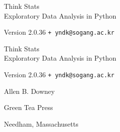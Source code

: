\documentclass[12pt]{book}
\makeatletter
\newcommand{\thetitle}{Think Stats}
\newcommand{\thesubtitle}{Exploratory Data Analysis in Python}
\newcommand{\theversion}{2.0.36 {\tt + yndk@sogang.ac.kr} }
\makeatother
\begin{document}
\begin{latexonly}

\renewcommand{\blankpage}{\thispagestyle{empty} \quad \newpage}



\thispagestyle{empty}

\begin{flushright}
\vspace*{2.0in}

\begin{spacing}{3}
{\huge \thetitle}\\
{\Large \thesubtitle }
\end{spacing}

\vspace{0.25in}

Version \theversion

\vfill

\end{flushright}


\blankpage
\blankpage

\pagebreak
\thispagestyle{empty}

\begin{flushright}
\vspace*{2.0in}

\begin{spacing}{3}
{\huge \thetitle}\\
{\Large \thesubtitle}
\end{spacing}

\vspace{0.25in}

Version \theversion

\vspace{1in}


{\Large
Allen B. Downey\\
}


\vspace{0.5in}

{\Large Green Tea Press}

{\small Needham, Massachusetts}

\vfill


\end{flushright}
\end{latexonly}
\end{document}
